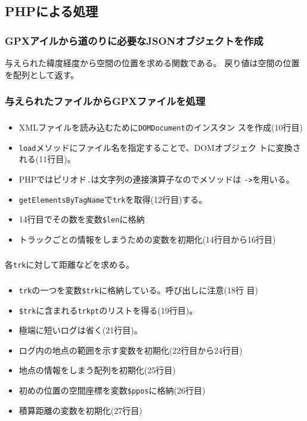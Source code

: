   \subsection{PHPによる処理}
\begin{frame}[containsverbatim]
 \frametitle{GPXアイルから道のりに必要なJSONオブジェクトを作成}
 与えられた緯度経度から空間の位置を求める関数である。
 戻り値は空間の位置を配列として返す。
\end{frame}
\begin{frame}[containsverbatim]
 \frametitle{与えられたファイルからGPXファイルを処理}
\end{frame}
\begin{frame}[containsverbatim]
 \frametitle{}
 \begin{itemize}
  \item XMLファイルを読み込むために\texttt{DOMDocument}のインスタン
        スを作成(10行目)
  \item \texttt{load}メソッドにファイル名を指定することで、DOMオブジェク
        トに変換される(11行目)。
  \item PHPではピリオド\texttt{.}は文字列の連接演算子なのでメソッドは
        \texttt{->}を用いる。
  \item \texttt{getElementsByTagName}で\texttt{trk}を取得(12行目)する。
  \item 14行目でその数を変数\texttt{\$len}に格納
  \item トラックごとの情報をしまうための変数を初期化(14行目から16行目)
 \end{itemize}
\end{frame}
\begin{frame}[containsverbatim]
 \frametitle{}
 各\texttt{trk}に対して距離などを求める。
\end{frame}
\begin{frame}[containsverbatim]
 \frametitle{}
 \begin{itemize}
  \item \texttt{trk}の一つを変数\texttt{\$trk}に格納している。呼び出しに注意(18行
        目)
  \item \texttt{\$trk}に含まれる\texttt{trkpt}のリストを得る(19行目)。
  \item 極端に短いログは省く(21行目)。
  \item ログ内の地点の範囲を示す変数を初期化(22行目から24行目)
  \item 地点の情報をしまう配列を初期化(25行目)
  \item 初めの位置の空間座標を変数\texttt{\$ppos}に格納(26行目)
  \item 積算距離の変数を初期化(27行目)
 \end{itemize}
\end{frame}
